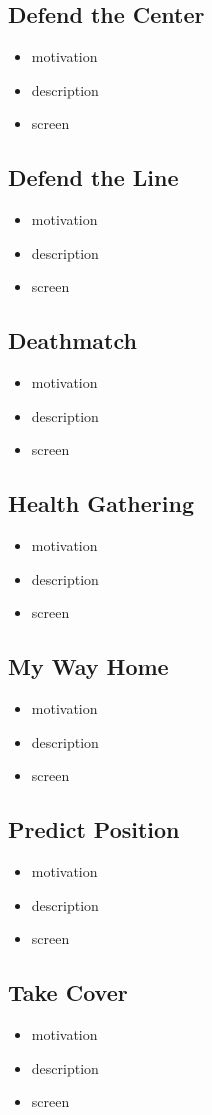 \subsection{Defend the Center}
\begin{itemize}
	\item motivation
	\item description
	\item screen
\end{itemize}

\subsection{Defend the Line}
\begin{itemize}
	\item motivation
	\item description
	\item screen
\end{itemize}

\subsection{Deathmatch}
\begin{itemize}
	\item motivation
	\item description
	\item screen
\end{itemize}

\subsection{Health Gathering}
\begin{itemize}
	\item motivation
	\item description
	\item screen
\end{itemize}

\subsection{My Way Home}
\begin{itemize}
	\item motivation
	\item description
	\item screen
\end{itemize}

\subsection{Predict Position}
\begin{itemize}
	\item motivation
	\item description
	\item screen
\end{itemize}

\subsection{Take Cover}
\begin{itemize}
	\item motivation
	\item description
	\item screen
\end{itemize}

